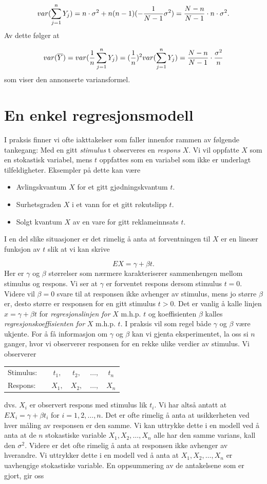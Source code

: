 \[  var( \sum_{j=1}^n Y_j) =n\cdot \sigma ^2 + n(n-1)
     ( -{1\over N-1}\sigma ^2) ={N-n\over N-1}\cdot n
     \cdot \sigma ^2.\]
Av dette følger at

\[   var(\bar Y)=var( {1\over n} \sum_{j=1}^n Y_j ) =
   ( {1\over n})^2 var (\sum_{j=1}^n Y_j)={N-n\over N-1}\cdot {\sigma ^2\over n}\] 
som viser den annonserte variansformel.
\normalsize


\section{En enkel regresjonsmodell}

I praksis finner vi ofte iakttakelser som faller innenfor rammen
av følgende tankegang: Med en gitt {\em stimulus} t observeres
en {\em respons} $X$. Vi vil oppfatte $X$ som en stokastisk
variabel, mens $t$ oppfattes som en variabel som ikke er
underlagt tilfeldigheter. Eksempler på dette kan være 
\begin{itemize}
\item Avlingskvantum $X$ for et gitt gjødningskvantum $t$.
\item Surhetsgraden $X$ i et vann for et gitt røkutslipp $t$.
\item Solgt kvantum $X$ av en vare for gitt reklameinnsats $t$.
\end{itemize}
I en del slike situasjoner er det rimelig å anta at
forventningen til $X$ er en lineær funksjon av $t$  slik at
vi kan skrive

\[     EX=\gamma + \beta t.\]
Her er $\gamma$ og $\beta$ størrelser som nærmere
karakteriserer sammenhengen mellom stimulus og respons. Vi ser at
$\gamma$ er forventet respons dersom stimulus $t=0$. Videre vil
$\beta=0$ svare til at responsen ikke avhenger av stimulus, mens
jo større $\beta$ er, desto større er responsen for en gitt
stimulus $t > 0$. Det er vanlig å kalle linjen $x=\gamma+\beta t $
for {\em regresjonslinjen for} $X$ m.h.p. $t$ og koeffisienten
$\beta$ kalles {\em regresjonskoeffisienten for} $X$ m.h.p. $t$. I
praksis vil som regel både $\gamma$ og $\beta$ være
ukjente. For å få informasjon om $\gamma$ og $\beta$ kan
vi gjenta eksperimentet, la oss si $n$ ganger, hvor vi observerer
responsen for en rekke ulike verdier av stimulus. Vi observerer
\begin{center}
\begin{tabular}{lccccc}
  Stimulus: & & $t_1,$ & $t_2,$ & $\ldots ,$ & $t_n$ \\
  Respons:  & & $X_1,$ & $X_2,$ & $\ldots ,$ & $X_n$
\end{tabular}
\end{center}
dvs. $X_i$ er observert respons med stimulus lik $t_i$.
Vi har altså antatt at $EX_i=\gamma + \beta t_i$ for
$i=1,2,\ldots ,n$. Det er ofte rimelig å anta at usikkerheten
ved hver måling av responsen er den samme. Vi kan uttrykke
dette i en modell ved å anta at de $n$ stokastiske variable
$X_1,X_2,\ldots ,X_n$ alle har den samme varians, kall den
$\sigma ^2$. Videre er det ofte rimelig å anta at responsen
ikke avhenger av hverandre. Vi uttrykker dette i en modell ved
å anta at $X_1,X_2,\ldots ,X_n$ er uavhengige stokastiske
variable. En oppsummering av de antakelsene som er gjort, gir oss

